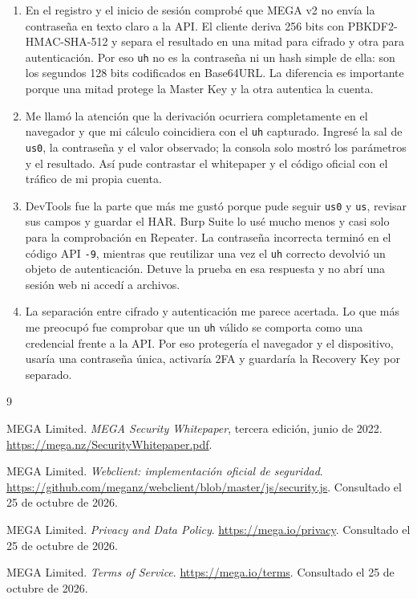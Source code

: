 \documentclass[letterpaper,12pt]{article}
\begin{document}
{\small
\begin{enumerate}
  \setlength{\itemsep}{3pt}
  \setlength{\parsep}{0pt}
  \item En el registro y el inicio de sesión comprobé que MEGA v2 no envía la contraseña en
  texto claro a la API. El cliente deriva 256 bits con PBKDF2-HMAC-SHA-512 y separa el
  resultado en una mitad para cifrado y otra para autenticación. Por eso \texttt{uh} no es
  la contraseña ni un hash simple de ella: son los segundos 128 bits codificados en
  Base64URL. La diferencia es importante porque una mitad protege la Master Key y la otra
  autentica la cuenta.

  \item Me llamó la atención que la derivación ocurriera completamente en el navegador y
  que mi cálculo coincidiera con el \texttt{uh} capturado. Ingresé la sal de \texttt{us0},
  la contraseña y el valor observado; la consola solo mostró los parámetros y el resultado.
  Así pude contrastar el whitepaper y el código oficial con el tráfico de mi propia cuenta.

  \item DevTools fue la parte que más me gustó porque pude seguir \texttt{us0} y \texttt{us},
  revisar sus campos y guardar el HAR. Burp Suite lo usé mucho menos y casi solo para la
  comprobación en Repeater. La contraseña incorrecta terminó en el código API \texttt{-9},
  mientras que reutilizar una vez el \texttt{uh} correcto devolvió un objeto de autenticación.
  Detuve la prueba en esa respuesta y no abrí una sesión web ni accedí a archivos.

  \item La separación entre cifrado y autenticación me parece acertada. Lo que más me preocupó
  fue comprobar que un \texttt{uh} válido se comporta como una credencial frente a la API.
  Por eso protegería el navegador y el dispositivo, usaría una contraseña única, activaría
  2FA y guardaría la Recovery Key por separado.
\end{enumerate}
}


{\small
\begin{thebibliography}{9}
\setlength{\itemsep}{1pt}
\setlength{\parsep}{0pt}

MEGA Limited.
\textit{MEGA Security Whitepaper}, tercera edición, junio de 2022.
\url{https://mega.nz/SecurityWhitepaper.pdf}.

MEGA Limited.
\textit{Webclient: implementación oficial de seguridad}.
\url{https://github.com/meganz/webclient/blob/master/js/security.js}.
Consultado el 25 de octubre de 2026.

MEGA Limited.
\textit{Privacy and Data Policy}.
\url{https://mega.io/privacy}.
Consultado el 25 de octubre de 2026.

MEGA Limited.
\textit{Terms of Service}.
\url{https://mega.io/terms}.
Consultado el 25 de octubre de 2026.

\end{thebibliography}
}
\end{document}

